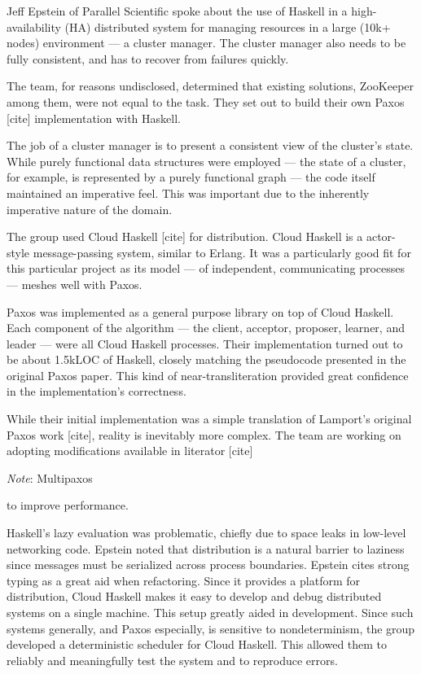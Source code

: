 \documentclass{jfp1}
\newenvironment{ipar}[0]%
 {\begin{list}{}%
 {\setlength{\leftmargin}{1cm}}%
\item[]%
 }
 {\end{list}}
\newcommand\needcite{{\color{red} [cite]}\xspace}
\newcommand{\note}[1]{ \begin{ipar}  {\color{Gray} \textit{Note}: #1} \end{ipar}}
\begin{document}

Jeff Epstein of Parallel Scientific spoke about the use of Haskell in
a high-availability (HA) distributed system for managing resources in
a large (10k+ nodes) environment --- a cluster manager. The cluster
manager also needs to be fully consistent, and has to recover from
failures quickly.

The team, for reasons undisclosed, determined that existing solutions,
ZooKeeper among them, were not equal to the task. They set out to
build their own Paxos\needcite implementation with Haskell.

The job of a cluster manager is to present a consistent view of the
cluster's state. While purely functional data structures were employed
--- the state of a cluster, for example, is represented by a purely
functional graph --- the code itself maintained an imperative feel.
This was important due to the inherently imperative nature of the
domain.

The group used Cloud Haskell\needcite for distribution. Cloud Haskell
is a actor-style message-passing system, similar to Erlang. It was a
particularly good fit for this particular project as its model --- of
independent, communicating processes --- meshes well with Paxos.

Paxos was implemented as a general purpose library on top of Cloud
Haskell. Each component of the algorithm --- the client, acceptor,
proposer, learner, and leader --- were all Cloud Haskell processes.
Their implementation turned out to be about 1.5kLOC of Haskell,
closely matching the pseudocode presented in the original Paxos paper.
This kind of near-transliteration provided great confidence in the
implementation's correctness.

While their initial implementation was a simple translation of
Lamport's original Paxos work\needcite, reality is inevitably more
complex. The team are working on adopting modifications available
in literator\needcite \note{Multipaxos} to improve performance.

Haskell's lazy evaluation was problematic, chiefly due to space leaks
in low-level networking code. Epstein noted that distribution is a
natural barrier to laziness since messages must be serialized across
process boundaries. Epstein cites strong typing as a great aid when
refactoring. Since it provides a platform for distribution, Cloud
Haskell makes it easy to develop and debug distributed systems on a
single machine. This setup greatly aided in development. Since such
systems generally, and Paxos especially, is sensitive to
nondeterminism, the group developed a deterministic scheduler for
Cloud Haskell. This allowed them to reliably and meaningfully test the
system and to reproduce errors.
\end{document}
